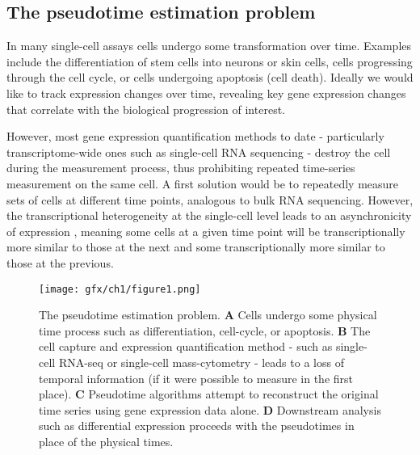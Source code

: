 \subsection{The pseudotime estimation problem}

In many single-cell assays cells undergo some transformation over time. Examples include the differentiation of stem cells into neurons or skin cells, cells progressing through the cell cycle, or cells undergoing apoptosis (cell death). Ideally we would like to track expression changes over time, revealing key gene expression changes that correlate with the biological progression of interest.

However, most gene expression quantification methods to date - particularly transcriptome-wide ones such as single-cell RNA sequencing - destroy the cell during the measurement process, thus prohibiting repeated time-series measurement on the same cell. A first solution would be to repeatedly measure sets of cells at different time points, analogous to bulk RNA sequencing. However, the transcriptional heterogeneity at the single-cell level leads to an asynchronicity of expression \cite{Trapnell2014-xi}, meaning some cells at a given time point will be transcriptionally more similar to those at the next and some transcriptionally more similar to those at the previous.

\begin{figure}
\centering
  \texttt{[image: gfx/ch1/figure1.png]}
  \caption{The pseudotime estimation problem.
\textbf{A} Cells undergo some physical time process such as differentiation, cell-cycle, or apoptosis.
\textbf{B} The cell capture and expression quantification method - such as single-cell RNA-seq or single-cell mass-cytometry - leads to a loss of temporal information (if it were possible to measure in the first place).
\textbf{C} Pseudotime algorithms attempt to reconstruct the original time series using gene expression data alone.
\textbf{D} Downstream analysis such as differential expression proceeds with the pseudotimes in place of the physical times.
  } \label{fig:pseudotime}
\end{figure}

